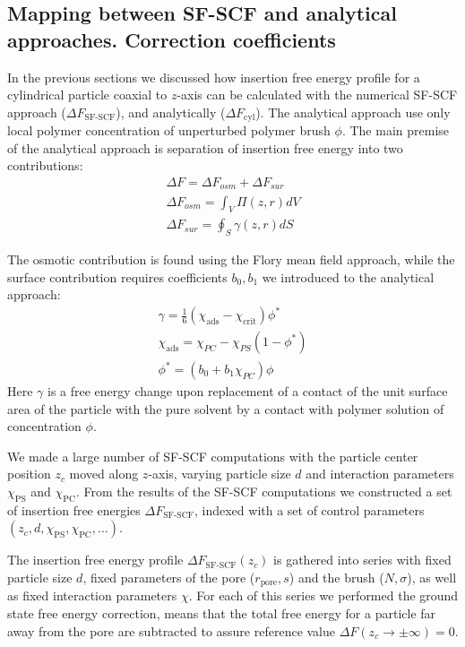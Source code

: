 \documentclass[10pt, a4paper]{article}
\begin{document}
\subsection*{Mapping between SF-SCF and analytical approaches. Correction coefficients}
\begin{multicols}{2}

In the previous sections we discussed how insertion free energy profile for a cylindrical particle coaxial to $z$-axis can be calculated with the numerical SF-SCF approach ($\Delta F_{\textrm{SF-SCF}}$), and analytically ($\Delta F_{\textrm{cyl}}$).
The analytical approach use only local polymer concentration of unperturbed polymer brush $\phi$.
The main premise of the analytical approach is separation of insertion free energy into two contributions:
\begin{eqnarray}
    \Delta F = \Delta F_{osm} + \Delta F_{sur}
    \\
    \Delta F_{osm} = \int_{V} \Pi(z,r) dV
    \\
    \Delta F_{sur} = \oint_{S} \gamma (z,r) dS
\label{Delta_F}
\end{eqnarray}

The osmotic contribution is found using the Flory mean field approach, while the surface contribution requires coefficients $b_0, b_1$ we introduced to the analytical approach:
\begin{eqnarray}
    \gamma = \frac{1}{6}(\chi_{\textrm{ads}} - \chi_{\textrm{crit}})\phi^{\ast}
    \\
    \chi_{\textrm{ads}} = \chi_{PC} - \chi_{PS}(1-\phi^{\ast})
    \\
    \phi^{\ast}= (b_{0} + b_{1}\chi_{PC})\phi \label{eq:phi_correction}
\end{eqnarray}
Here $\gamma$ is a free energy change upon replacement of a contact of the unit surface area of the particle with the pure solvent by a contact with polymer solution of concentration $\phi$.

We made a large number of SF-SCF computations with the particle center position $z_{c}$ moved along $z$-axis, varying particle size $d$ and interaction parameters $\chi_{\textrm{PS}}$ and $\chi_{\textrm{PC}}$. 
From the results of the SF-SCF computations we constructed a set of insertion free energies $\Delta F_{\textrm{SF-SCF}}$, indexed with a set of control parameters $(z_c, d, \chi_{\textrm{PS}}, \chi_{\textrm{PC}}, \dots)$.

The insertion free energy profile $\Delta F_{\textrm{SF-SCF}}(z_c)$ is gathered into series with fixed particle size $d$, fixed parameters of the pore ($r_{\textrm{pore}}, s$) and the brush ($N, \sigma$), as well as fixed interaction parameters $\chi$.
For each of this series we performed the ground state free energy correction, means that the total free energy for a particle far away from the pore are subtracted to assure reference value $\Delta F(z_c \to \pm \infty) = 0$.


\end{multicols}
\end{document}

